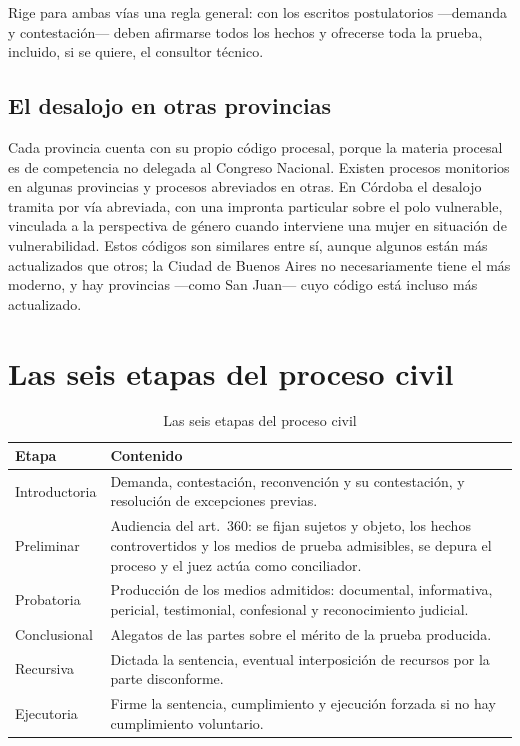 \documentclass[12pt,oneside]{book}
\begin{document}
Rige para ambas vías una regla general: con los escritos postulatorios ---demanda y contestación--- deben afirmarse todos los hechos y ofrecerse toda la prueba, incluido, si se quiere, el consultor técnico.

\subsection{El desalojo en otras provincias}

Cada provincia cuenta con su propio código procesal, porque la materia procesal es de competencia no delegada al Congreso Nacional. Existen procesos monitorios en algunas provincias y procesos abreviados en otras. En Córdoba el desalojo tramita por vía abreviada, con una impronta particular sobre el polo vulnerable, vinculada a la perspectiva de género cuando interviene una mujer en situación de vulnerabilidad. Estos códigos son similares entre sí, aunque algunos están más actualizados que otros; la Ciudad de Buenos Aires no necesariamente tiene el más moderno, y hay provincias ---como San Juan--- cuyo código está incluso más actualizado.

\section{Las seis etapas del proceso civil}

\begin{table}[H]
\centering
\caption{Las seis etapas del proceso civil}
\begin{tabularx}{\textwidth}{>{\raggedright\arraybackslash}p{} X}
\toprule
\textbf{Etapa} & \textbf{Contenido} \\
\midrule
Introductoria & Demanda, contestación, reconvención y su contestación, y resolución de excepciones previas. \\
Preliminar & Audiencia del art.\ 360: se fijan sujetos y objeto, los hechos controvertidos y los medios de prueba admisibles, se depura el proceso y el juez actúa como conciliador. \\
Probatoria & Producción de los medios admitidos: documental, informativa, pericial, testimonial, confesional y reconocimiento judicial. \\
Conclusional & Alegatos de las partes sobre el mérito de la prueba producida. \\
Recursiva & Dictada la sentencia, eventual interposición de recursos por la parte disconforme. \\
Ejecutoria & Firme la sentencia, cumplimiento y ejecución forzada si no hay cumplimiento voluntario. \\
\bottomrule
\end{tabularx}
\end{table}
\end{document}
